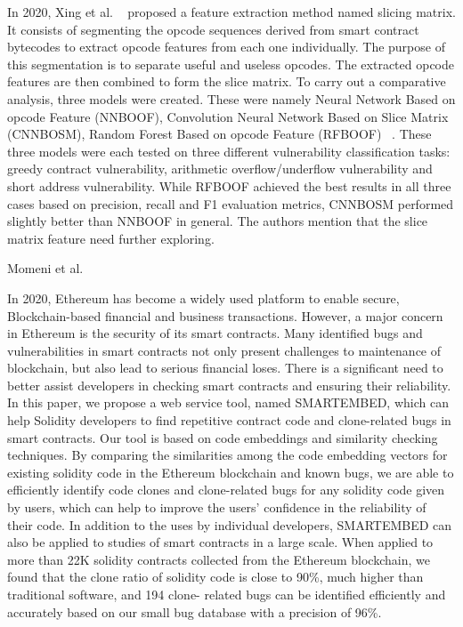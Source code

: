 In 2020, Xing et al. ~\cite{xing2020new} proposed a feature extraction method named slicing matrix.
It consists of segmenting the opcode sequences derived from
smart contract bytecodes to extract opcode features from each one individually.
The purpose of this segmentation is to separate useful and useless opcodes.
The extracted opcode features are then combined to form the slice matrix.
To carry out a comparative analysis, three models were created.
These were namely Neural Network Based on opcode Feature (NNBOOF), Convolution Neural Network Based on Slice Matrix (CNNBOSM), Random Forest Based on opcode Feature
(RFBOOF) ~\cite{hu2021comprehensive}.
These three models were each tested on three different vulnerability classification tasks: greedy contract vulnerability, arithmetic overflow/underflow vulnerability and short address vulnerability.
While RFBOOF achieved the best results in all three cases based on precision, recall and F1 evaluation metrics, CNNBOSM performed slightly better than NNBOOF in general.
The authors mention that the slice matrix feature need further exploring.

Momeni et al.

In 2020, Ethereum has become a widely used platform to enable secure, Blockchain-based financial and business transactions.
However, a major concern in Ethereum is the security of its smart contracts.
Many identified bugs and vulnerabilities in smart contracts not only present challenges to maintenance of blockchain,
but also lead to serious financial loses. There is a significant need to better assist developers in checking smart contracts and ensuring their reliability.
In this paper, we propose a web service tool, named SMARTEMBED, which can help Solidity developers to find repetitive contract code and clone-related bugs in smart contracts.
Our tool is based on code embeddings and similarity checking techniques.
By comparing the similarities among the code embedding vectors for existing solidity code in the Ethereum blockchain and known bugs,
we are able to efficiently identify code clones and clone-related bugs for any solidity code given by users, which can help to improve the users' confidence in the reliability of their code.
In addition to the uses by individual developers, SMARTEMBED can also be applied to studies of smart contracts in a large scale.
When applied to more than 22K solidity contracts collected from the Ethereum blockchain, we found that the clone ratio of solidity code is close to 90\%, much higher than traditional software,
and 194 clone- related bugs can be identified efficiently and accurately based on our small bug database with a precision of 96\%.


